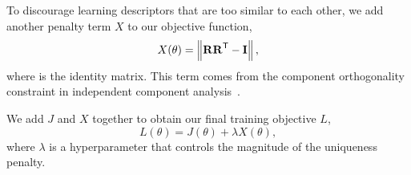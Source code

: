 To discourage learning descriptors that are too similar to
each other, we add another penalty term $X$ to our objective function,
\begin{equation}\label{eq:unique}
	X(\theta) = \left\lVert \text{\textbf{R}}\text{\textbf{R}}^\mathsf{T} - \text{\textbf{I}} \right\rVert,
\end{equation}
where  is the identity matrix. This term comes from
the component orthogonality constraint in independent component
analysis~\cite{hyvarinen2000independent}.

We add $J$ and $X$ together to obtain our final training objective $L$,
\begin{equation}\label{eq:final}
	L(\theta) = J(\theta) + \lambda X(\theta),
\end{equation}
where $\lambda$ is a hyperparameter that controls the magnitude of the
uniqueness penalty.
